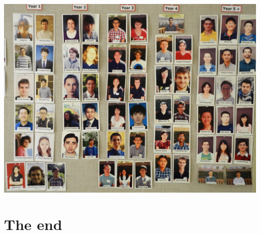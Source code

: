 \documentclass{beamer}
\begin{document}
\begin{frame}
\begin{center}
\includegraphics[scale = 0.3]{DSCN3964.JPG}
\end{center}
\end{frame}

\section*{The end}

\begin{frame}
\sectionpage
\end{frame}
\end{document}
